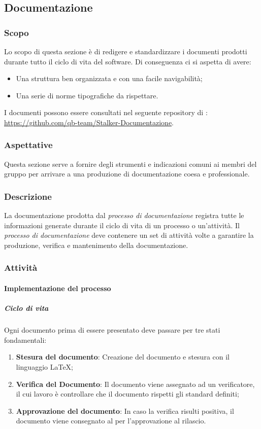 \subsection{Documentazione}
\subsubsection{Scopo}
Lo scopo di questa sezione è di redigere e standardizzare i documenti prodotti durante tutto il ciclo di vita del software. 
Di conseguenza ci si aspetta di avere:
\begin{itemize}
\item Una struttura ben organizzata e con una facile navigabilità;
\item Una serie di norme tipografiche da rispettare.
\end{itemize}
I documenti possono essere consultati nel seguente repository di :
\\
\url{https://github.com/qb-team/Stalker-Documentazione}.
\subsubsection{Aspettative}
Questa sezione serve a fornire degli strumenti e indicazioni comuni ai membri del gruppo per arrivare a una produzione di documentazione coesa e professionale.

\subsubsection{Descrizione}
La documentazione prodotta dal \textit{processo di documentazione} registra tutte le informazioni generate durante il ciclo di vita di un processo o un'attività.
Il \textit{processo di documentazione} deve contenere un set di attività volte a garantire la produzione, verifica e mantenimento della documentazione.

\subsubsection{Attività}

\paragraph{Implementazione del processo}
\subparagraph*{Ciclo di vita}
Ogni documento prima di essere presentato deve passare per tre stati fondamentali:
\begin{enumerate}
\item \textbf{Stesura del documento}: Creazione del documento e stesura con il linguaggio \LaTeX;
\item \textbf{Verifica del Documento}: Il documento viene assegnato ad un verificatore, il cui lavoro è controllare che il documento rispetti gli standard definiti;
\item \textbf{Approvazione del documento}: In caso la verifica risulti positiva, il documento viene consegnato al \Responsabile{} per l'approvazione al rilascio.
\end{enumerate}

